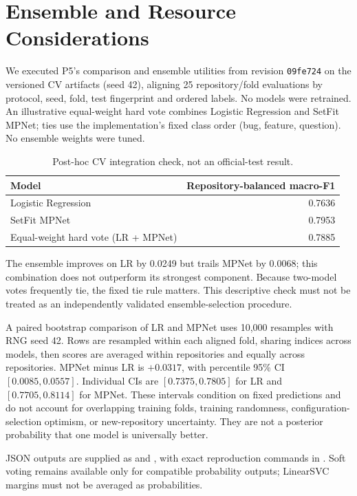 \section{Ensemble and Resource Considerations}
We executed P5's comparison and ensemble utilities from revision \texttt{09fe724} on the versioned CV artifacts (seed 42), aligning 25 repository/fold evaluations by protocol, seed, fold, test fingerprint and ordered labels. No models were retrained. An illustrative equal-weight hard vote combines Logistic Regression and SetFit MPNet; ties use the implementation's fixed class order (bug, feature, question). No ensemble weights were tuned.

\begin{table}[H]
\centering
\caption{Post-hoc CV integration check, not an official-test result.}
\begin{tabular}{lr}
\toprule
Model & Repository-balanced macro-F1 \\
\midrule
Logistic Regression & 0.7636 \\
SetFit MPNet & 0.7953 \\
Equal-weight hard vote (LR + MPNet) & 0.7885 \\
\bottomrule
\end{tabular}
\end{table}
The ensemble improves on LR by 0.0249 but trails MPNet by 0.0068; this combination does not outperform its strongest component. Because two-model votes frequently tie, the fixed tie rule matters. This descriptive check must not be treated as an independently validated ensemble-selection procedure.

A paired bootstrap comparison of LR and MPNet uses 10,000 resamples with RNG seed 42. Rows are resampled within each aligned fold, sharing indices across models, then scores are averaged within repositories and equally across repositories. MPNet minus LR is $+0.0317$, with percentile 95\% CI $[0.0085,0.0557]$. Individual CIs are $[0.7375,0.7805]$ for LR and $[0.7705,0.8114]$ for MPNet. These intervals condition on fixed predictions and do not account for overlapping training folds, training randomness, configuration-selection optimism, or new-repository uncertainty. They are not a posterior probability that one model is universally better.

JSON outputs are supplied as  and , with exact reproduction commands in . Soft voting remains available only for compatible probability outputs; LinearSVC margins must not be averaged as probabilities.

